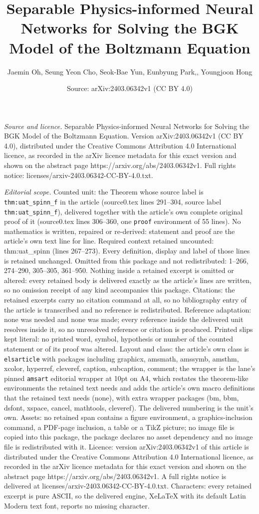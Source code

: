 \documentclass[10pt,a4paper]{amsart}
\title[Separable Physics-informed Neural Networks for Solving the B]{Separable Physics-informed Neural Networks for Solving the BGK Model of the Boltzmann Equation}
\author{Jaemin Oh, Seung Yeon Cho, Seok-Bae Yun, Eunbyung Park,, Youngjoon Hong}
\date{Source: arXiv:2403.06342v1 (CC BY 4.0)}
\begin{document}
\maketitle

\noindent\emph{Source and licence.} Separable Physics-informed Neural Networks for Solving the BGK Model of the Boltzmann Equation. Version arXiv:2403.06342v1 (CC BY 4.0), distributed under the Creative Commons Attribution 4.0 International licence, as recorded in the arXiv licence metadata for this exact version and shown on the abstract page https://arxiv.org/abs/2403.06342v1. Full rights notice: licenses/arxiv-2403.06342-CC-BY-4.0.txt.\par\smallskip

\noindent\textit{Editorial scope.} Counted unit: the Theorem whose source label is \texttt{thm:uat\_spinn\_f} in the article (source0.tex lines 291--304, source label \texttt{thm:uat\_spinn\_f}), delivered together with the article's own complete original proof of it (source0.tex lines 306--360, one \texttt{proof} environment of 55 lines). No mathematics is written, repaired or re-derived: statement and proof are the article's own text line for line. Required context retained uncounted: thm:uat\_spinn (lines 267--273). Every definition, display and label of those lines is retained unchanged. Omitted from this package and not redistributed: 1--266, 274--290, 305--305, 361--950. Nothing inside a retained excerpt is omitted or altered: every retained body is delivered exactly as the article's lines are written, so no omission receipt of any kind accompanies this package. Citations: the retained excerpts carry no citation command at all, so no bibliography entry of the article is transcribed and no reference is redistributed. Reference adaptation: none was needed and none was made; every reference inside the delivered unit resolves inside it, so no unresolved reference or citation is produced. Printed slips kept literal: no printed word, symbol, hypothesis or number of the counted statement or of its proof was altered. Layout and class: the article's own class is \texttt{elsarticle} with packages including graphicx, amsmath, amssymb, amsthm, xcolor, hyperref, cleveref, caption, subcaption, comment; the wrapper is the lane's pinned \texttt{amsart} editorial wrapper at 10pt on A4, which restates the theorem-like environments the retained text needs and adds the article's own macro definitions that the retained text needs (none), with extra wrapper packages (bm, bbm, dsfont, xspace, cancel, mathtools, cleveref). The delivered numbering is the unit's own. Assets: no retained span contains a figure environment, a graphics-inclusion command, a PDF-page inclusion, a table or a TikZ picture; no image file is copied into this package, the package declares no asset dependency and no image file is redistributed with it. Licence: version arXiv:2403.06342v1 of this article is distributed under the Creative Commons Attribution 4.0 International licence, as recorded in the arXiv licence metadata for this exact version and shown on the abstract page https://arxiv.org/abs/2403.06342v1. A full rights notice is delivered at licenses/arxiv-2403.06342-CC-BY-4.0.txt. Characters: every retained excerpt is pure ASCII, so the delivered engine, XeLaTeX with its default Latin Modern text font, reports no missing character.
\end{document}
